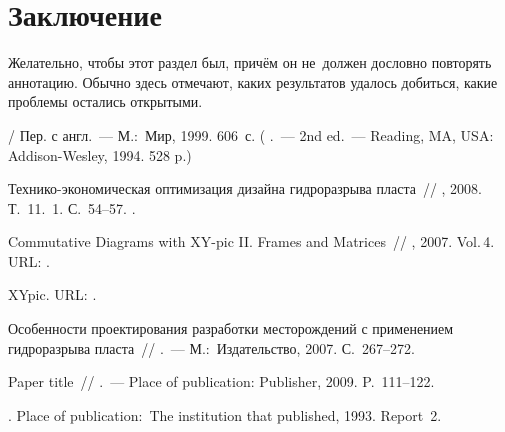 \documentclass[12pt, twoside]{article}
\begin{document}
\section{Заключение}
Желательно, чтобы этот раздел был, причём он не~должен дословно повторять аннотацию.
Обычно здесь отмечают, каких результатов удалось добиться, какие проблемы остались открытыми.

\begin{thebibliography}{99}
     / Пер. с англ.~---
    М.:~Мир, 1999. 606~с.
    (
     .~--- 2nd ed.~--- Reading, MA, USA: Addison-Wesley, 1994. 528 p.)

    Технико-экономическая оптимизация дизайна гидроразрыва пласта~//
    , 2008. Т.~11. \No\,1. С.~54--57.
	.

	Commutative Diagrams with XY-pic II. Frames and Matrices~//
	, 2007. Vol.\,4.
	URL: .

	XYpic.
	URL: .
	
	Особенности проектирования разработки месторождений с применением гидроразрыва пласта~//
	.~---
	М.:~Издательство, 2007. С.~267--272.

    Paper title~//
    .~---
    Place of publication: Publisher, 2009. P.~111--122.

  	.
  	Place of publication:~The institution that published, 1993.  Report~2.
 	
\end{thebibliography}
\end{document}
